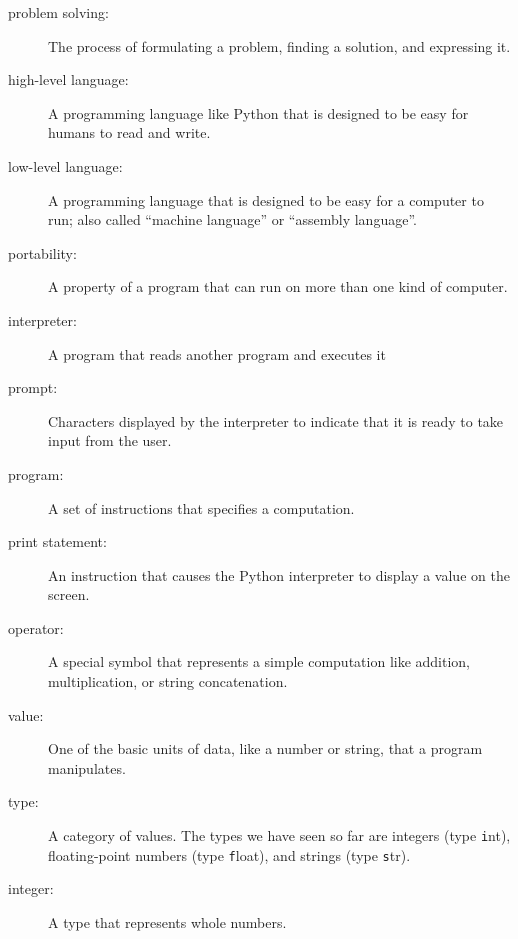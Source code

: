 \documentclass[
DIV=11,
fontsize=13,
twoside,
headinclude=false,
titlepage=firstiscover,
abstract=true,
headsepline=true,
footsepline=true,
chapterprefix=true, %
headings=big,
bibliography=totoc,%
captions=tableheading
]{scrbook}
\theoremstyle{definition}
\begin{document}
\begin{description}

\item[problem solving:]  The process of formulating a problem, finding
a solution, and expressing it.

\item[high-level language:]  A programming language like Python that
is designed to be easy for humans to read and write.

\item[low-level language:]  A programming language that is designed
to be easy for a computer to run; also called ``machine language'' or
``assembly language''.

\item[portability:]  A property of a program that can run on more
than one kind of computer.

\item[interpreter:]  A program that reads another program and executes
it

\item[prompt:] Characters displayed by the interpreter to indicate
that it is ready to take input from the user.

\item[program:] A set of instructions that specifies a computation.

\item[print statement:]  An instruction that causes the Python
interpreter to display a value on the screen.

\item[operator:]  A special symbol that represents a simple computation like
addition, multiplication, or string concatenation.

\item[value:]  One of the basic units of data, like a number or string, 
that a program manipulates.

\item[type:] A category of values.  The types we have seen so far
are integers (type {\texttt int}), floating-point numbers (type {\texttt
float}), and strings (type {\texttt str}).

\item[integer:] A type that represents whole numbers.


\end{description}
\end{document}
